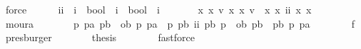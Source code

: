 \begin{isabellebody}
\ force\isanewline
\ \ \ \ \isamarkupfalse%
\ ii\ {\isacharcolon}{\isacharcolon}\ {\isachardoublequoteopen}{\isacharparenleft}i\ {\isasymRightarrow}\ bool{\isacharparenright}\ {\isasymRightarrow}\ {\isacharparenleft}i\ {\isasymRightarrow}\ bool{\isacharparenright}\ {\isasymRightarrow}\ i{\isachardoublequoteclose}\ \isanewline
\ \ \ \ \ \ {\isachardoublequoteopen}{\isasymforall}x{}\ x{}{\isachardot}\ {\isacharparenleft}{\isasymexists}v{}{\isachardot}\ {\isacharparenleft}x{}\isactrlbold {\isasymand}{\isacharparenleft}\isactrlbold {\isasymnot}\ x{}{\isacharparenright}{\isacharparenright}\ v{}{\isacharparenright}\ {\isacharequal}\ {\isacharparenleft}x{}\isactrlbold {\isasymand}{\isacharparenleft}\isactrlbold {\isasymnot}\ x{}{\isacharparenright}{\isacharparenright}\ {\isacharparenleft}ii\ x{}\ x{}{\isacharparenright}{\isachardoublequoteclose}\isanewline
\ \ \ \ \ \ \isamarkupfalse%
\ moura\isanewline
\ \ \ \ \isamarkupfalse%
\ \isamarkupfalse%
\ {\isachardoublequoteopen}{\isasymforall}p\ pa\ pb{\isachardot}\ {\isacharparenleft}{\isacharparenleft}{\isasymnot}\ ob\ p\ pa{\isacharparenright}\ {\isasymor}\ {\isacharparenleft}p\isactrlbold {\isasymand}{\isacharparenleft}\isactrlbold {\isasymnot}\ pb{\isacharparenright}{\isacharparenright}\ {\isacharparenleft}ii\ pb\ p{\isacharparenright}{\isacharparenright}\ {\isasymor}\ ob\ pb\ {\isacharparenleft}\ {\isacharparenleft}pb\isactrlbold {\isasymand}{\isacharparenleft}\isactrlbold {\isasymnot}\ p{\isacharparenright}{\isacharparenright}\isactrlbold {\isasymor}\ pa{\isacharparenright}{\isachardoublequoteclose}\isanewline
\ \ \ \ \ \ \isamarkupfalse%
\ f{}\ \isamarkupfalse%
\ presburger\isanewline
\ \ \ \ \isamarkupfalse%
\ \isamarkupfalse%
\ {\isacharquery}thesis\isanewline
\ \ \ \ \ \ \isamarkupfalse%
\ fastforce\isanewline
\ \ \isamarkupfalse%
\isanewline
{}\isamarkupfalse%
\isanewline
%
%
\endisatagproof
{\isafoldproof}%
%
\isadelimproof
%
\endisadelimproof
%
\isadelimdocument
%
\endisadelimdocument
%
\isatagdocument
%
\isamarkuptrue%
%
%
\endisatagdocument
{\isafolddocument}%
%
\isadelimdocument
\isanewline
%
\endisadelimdocument
{}\isamarkupfalse%

\end{isabellebody}
